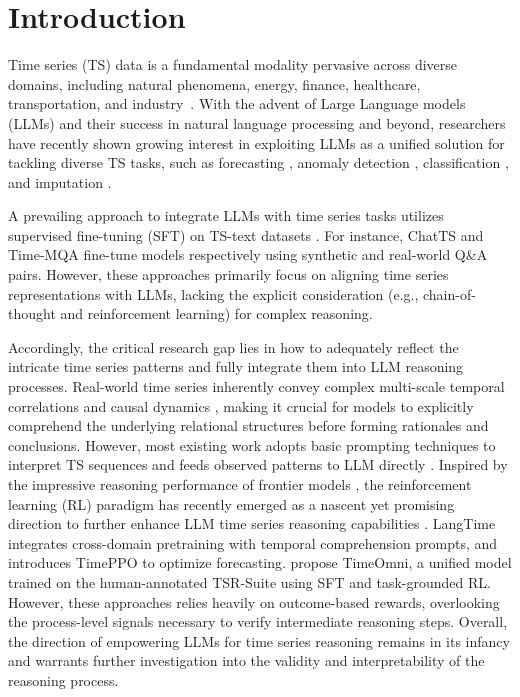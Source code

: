 \documentclass{article}
\theoremstyle{plain}
\theoremstyle{definition}
\theoremstyle{remark}
\begin{document}
\section{Introduction}

Time series (TS) data is a fundamental modality pervasive across diverse domains, including natural phenomena, energy, finance, healthcare, transportation, and industry~\cite{nips25mira, nips25trace, nips25gem, icml25fstllm, nips25bridging}. With the advent of Large Language models (LLMs) and their success in natural language processing and beyond, researchers have recently shown growing interest in exploiting LLMs as a unified solution for tackling diverse TS tasks, such as forecasting \cite{icml25visionts, lu2024context, icml25enhancingWave}, anomaly detection \cite{dai2024sarad, icml25park2025when}, classification \cite{nips25shapex, goswami2024moment}, and imputation \cite{icml25lscd, nips25glocal}. 

A prevailing approach to integrate LLMs with time series tasks utilizes supervised fine-tuning (SFT) on TS-text datasets \cite{wang2025chattime, acl25promedts}. For instance, ChatTS \cite{xie2025chatts} and Time-MQA \cite{kong2025timeMQA} fine-tune models respectively using synthetic and real-world Q\&A pairs. However, these approaches primarily focus on aligning time series representations with LLMs, lacking the explicit consideration (e.g., chain-of-thought and reinforcement learning) for complex reasoning.


Accordingly, the critical research gap lies in how to adequately reflect the intricate time series patterns and fully integrate them into LLM reasoning processes. Real-world time series inherently convey complex multi-scale temporal correlations and causal dynamics \cite{icml25timing, icml2025timebridge}, making it crucial for models to explicitly comprehend the underlying relational structures before forming rationales and conclusions. However, most existing work adopts basic prompting techniques to interpret TS sequences and feeds observed patterns to LLM directly \cite{liu2024lstprompt, merrill2024language, gruver2023large}. Inspired by the impressive reasoning performance of frontier models \cite{jaech2024openai, guo2025deepseek}, the reinforcement learning (RL) paradigm has recently emerged as a nascent yet promising direction to further enhance LLM time series reasoning capabilities \cite{zhang2025timemaster, luo2025timeR1}. LangTime \cite{icml25langtime} integrates cross-domain pretraining with temporal comprehension prompts, and introduces TimePPO to optimize forecasting. \citet{guan2025timeomni} propose TimeOmni, a unified model trained on the human-annotated TSR-Suite using SFT and task-grounded RL. However, these approaches relies heavily on outcome-based rewards, overlooking the process-level signals necessary to verify intermediate reasoning steps. Overall, the direction of empowering LLMs for time series reasoning remains in its infancy and warrants further investigation into the validity and interpretability of the reasoning process.
\end{document}
